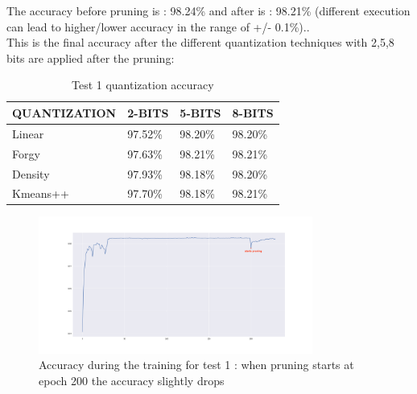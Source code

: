 \documentclass[journal]{vgtc}                %
\begin{document}
The accuracy before pruning is : 98.24\% and after is : 98.21\% (different execution can lead to higher/lower accuracy in the range of +/- 0.1\%)..\\This is the final accuracy after the different quantization techniques with 2,5,8 bits are applied after the pruning:
\begin{table}[H]
\caption{Test 1 quantization accuracy}
\label{my-label}
\begin{tabular}{|l|l|l|l|}
\hline
QUANTIZATION & 2-BITS  & 5-BITS  & 8-BITS  \\ \hline
Linear       & 97.52\% & 98.20\% & 98.20\% \\ \hline
Forgy        & 97.63\% & 98.21\% & 98.21\% \\ \hline
Density       & 97.93\% & 98.18\% & 98.20\% \\ \hline
Kmeans++     & 97.70\% & 98.18\% & 98.21\% \\ \hline
\end{tabular}
\end{table}\begin{figure}[H]
	\includegraphics[width=90mm,scale=0.7]{accuracy-soft-threshold}
	\caption{Accuracy during the training for test 1 : when pruning starts at epoch 200 the accuracy slightly drops}
\end{figure}
\end{document}
